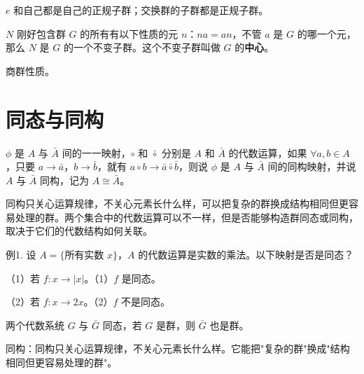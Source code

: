 \begin{proposition}
$e$ 和自己都是自己的正规子群；交换群的子群都是正规子群。
\end{proposition}

\begin{example}[不变子群的中心]
$N$ 刚好包含群 $G$ 的所有有以下性质的元 $n$：$na=an$，不管 $a$ 是 $G$ 的哪一个元，那么 $N$ 是 $G$ 的一个不变子群。这个不变子群叫做 $G$ 的\textbf{中心}。
\end{example}

\begin{note}[商群性质]
商群性质。
\end{note}

\section{同态与同构}

\begin{definition}[同态与同构]
$\phi$ 是 $A$ 与 $\bar{A}$ 间的一一映射，$\circ$ 和 $\bar{\circ}$ 分别是 $A$ 和 $\bar{A}$ 的代数运算，如果 $\forall a,b\in A$，只要 $a\to\bar{a}$，$b\to\bar{b}$，就有 $a\circ b\to\bar{a}\bar{\circ}\bar{b}$，则说 $\phi$ 是 $A$ 与 $\bar{A}$ 间的同构映射，并说 $A$ 与 $\bar{A}$ 同构，记为 $A\cong\bar{A}$。

同构只关心运算规律，不关心元素长什么样，可以把复杂的群换成结构相同但更容易处理的群。两个集合中的代数运算可以不一样，但是否能够构造群同态或同构，取决于它们的代数结构如何关联。
\end{definition}

\begin{example}[同态例子]
例1. 设 $A=\{\text{所有实数 }x\}$，$A$ 的代数运算是实数的乘法。以下映射是否是同态？

（1）若 $f:x\to|x|$。（1）$f$ 是同态。

（2）若 $f:x\to2x$。（2）$f$ 不是同态。
\end{example}

\begin{theorem}[同态定理]
两个代数系统 $G$ 与 $\bar{G}$ 同态，若 $G$ 是群，则 $\bar{G}$ 也是群。
\end{theorem}

\begin{note}[同态的意义]
同构：同构只关心运算规律，不关心元素长什么样。它能把"复杂的群"换成"结构相同但更容易处理的群"。
\end{note}

